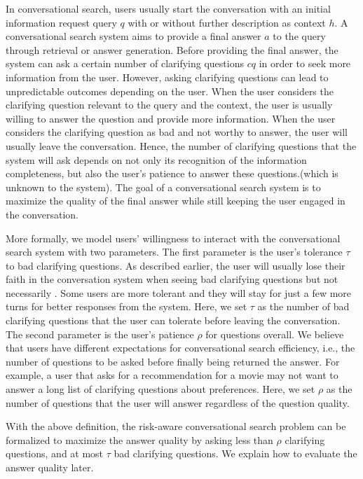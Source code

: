 \documentclass[format=acmsmall, review=False, screen=true]{acmart}
\begin{document}
In conversational search, users usually start the conversation with an initial information request query $q$ with or without further description as context $h$. A conversational search system aims to provide a final answer $a$ to the query through retrieval or answer generation. Before providing the final answer, the system can ask a certain number of clarifying questions $cq$ in order to seek more information from the user. However, asking clarifying questions can lead to unpredictable outcomes depending on the user. When the user considers the clarifying question relevant to the query and the context, the user is usually willing to answer the question and provide more information. When the user considers the clarifying question as bad and not worthy to answer, the user will usually leave the conversation. Hence, the number of clarifying questions that the system will ask depends on not only its recognition of the information completeness, but also the user's patience to answer these questions.(which is unknown to the system). The goal of a conversational search system is to maximize the quality of the final answer while still keeping the user engaged in the conversation.

More formally, we model users' willingness to interact with the conversational search system with two parameters. The first parameter is the user's tolerance $\tau$ to bad clarifying questions. As described earlier, the user will usually lose their faith in the conversation system when seeing bad clarifying questions but not necessarily \cite{zamania}. Some users are more tolerant and they will stay for just a few more turns for better responses from the system. Here, we set $\tau$ as the number of bad clarifying questions that the user can tolerate before leaving the conversation. The second parameter is the user's patience $\rho$ for questions overall. We believe that users have different expectations for conversational search efficiency, i.e., the number of questions to be asked before finally being returned the answer. For example, a user that asks for a recommendation for a movie may not want to answer a long list of clarifying questions about preferences. Here, we set $\rho$ as the number of questions that the user will answer regardless of the question quality.

With the above definition, the risk-aware conversational search problem can be formalized to maximize the answer quality by asking less than $\rho$ clarifying questions, and at most $\tau$ bad clarifying questions. We explain how to evaluate the answer quality later.
\end{document}
